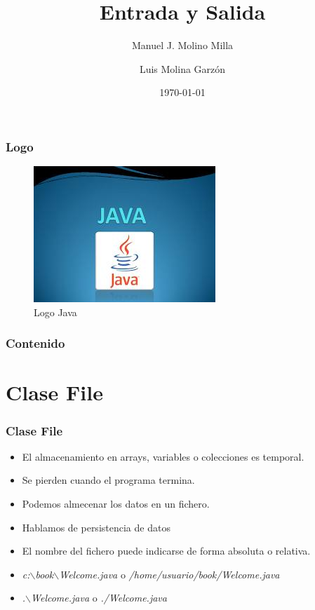 \documentclass{beamer}
\title{Entrada y Salida}
\author{Manuel J. Molino Milla \and Luis Molina Garzón}
\date{\today} %
\institute{IES Virgen del Carmen \and Departamento de Informática}
\begin{document}
\begin{frame}
  \titlepage
\end{frame}

\begin{frame}
    \frametitle{Logo}
\begin{figure}
\includegraphics[scale=1]{imagenes/logo.jpeg} 
\caption{Logo Java}
\end{figure}
\end{frame}

\begin{frame}
  \frametitle{Contenido}
  \tableofcontents[pausesections]
\end{frame}

\section{Clase File}
\begin{frame}
\frametitle{Clase File}
\begin{itemize}[<+-|alert@+>]
\item El almacenamiento en arrays, variables o colecciones es temporal.
\item Se pierden cuando el programa termina.
\item Podemos almecenar los datos en un fichero.
\item Hablamos de \alert{persistencia de datos}
\item El nombre del fichero puede indicarse de forma absoluta o relativa.
\item \emph{c:$\backslash$book$\backslash$Welcome.java} o \emph{/home/usuario/book/Welcome.java}
\item \emph{.$\backslash$Welcome.java} o \emph{./Welcome.java}
\end{itemize}
\pause
\end{frame}
\end{document}
